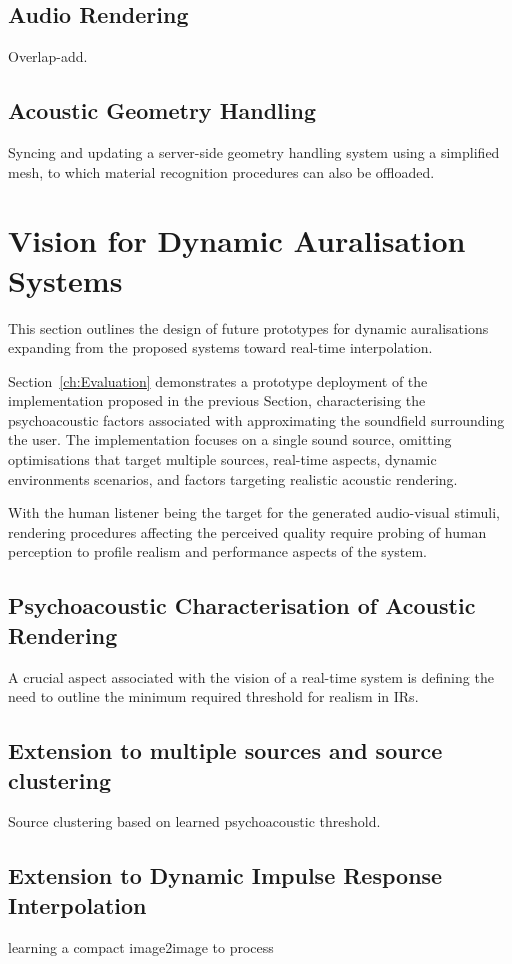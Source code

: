 \subsection{Audio Rendering}
Overlap-add.


\subsection{Acoustic Geometry Handling}
Syncing and updating a server-side geometry handling system using a simplified mesh, to which material recognition procedures can also be offloaded.

\section{Vision for Dynamic Auralisation Systems}
This section outlines the design of future prototypes for dynamic auralisations expanding from the proposed systems toward real-time interpolation.\par
Section~\ref{ch:Evaluation} demonstrates a prototype deployment of the implementation proposed in the previous Section, characterising the psychoacoustic factors associated with approximating the soundfield surrounding the user. The implementation focuses on a single sound source, omitting optimisations that target multiple sources, real-time aspects, dynamic environments scenarios, and factors targeting realistic acoustic rendering.\par
With the human listener being the target for the generated audio-visual stimuli, rendering procedures affecting the perceived quality require probing of human perception to profile realism and performance aspects of the system. 


\subsection{Psychoacoustic Characterisation of Acoustic Rendering}
A crucial aspect associated with the vision of a real-time system is defining the need to outline the minimum required threshold for realism in IRs.

\subsection{Extension to multiple sources and source clustering}
Source clustering based on learned psychoacoustic threshold.

\subsection{Extension to Dynamic Impulse Response Interpolation}
learning a compact image2image to process 

